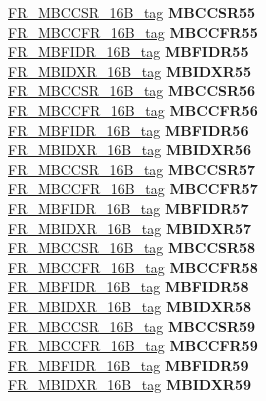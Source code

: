 \begin{DoxyCompactItemize}
\begin{tabbing}
\>\>\mbox{\hyperlink{unionFR__MBCCSR__16B__tag}{FR\_MBCCSR\_16B\_tag}} {\bfseries MBCCSR55}\\
\>\>\mbox{\hyperlink{unionFR__MBCCFR__16B__tag}{FR\_MBCCFR\_16B\_tag}} {\bfseries MBCCFR55}\\
\>\>\mbox{\hyperlink{unionFR__MBFIDR__16B__tag}{FR\_MBFIDR\_16B\_tag}} {\bfseries MBFIDR55}\\
\>\>\mbox{\hyperlink{unionFR__MBIDXR__16B__tag}{FR\_MBIDXR\_16B\_tag}} {\bfseries MBIDXR55}\\
\>\>\mbox{\hyperlink{unionFR__MBCCSR__16B__tag}{FR\_MBCCSR\_16B\_tag}} {\bfseries MBCCSR56}\\
\>\>\mbox{\hyperlink{unionFR__MBCCFR__16B__tag}{FR\_MBCCFR\_16B\_tag}} {\bfseries MBCCFR56}\\
\>\>\mbox{\hyperlink{unionFR__MBFIDR__16B__tag}{FR\_MBFIDR\_16B\_tag}} {\bfseries MBFIDR56}\\
\>\>\mbox{\hyperlink{unionFR__MBIDXR__16B__tag}{FR\_MBIDXR\_16B\_tag}} {\bfseries MBIDXR56}\\
\>\>\mbox{\hyperlink{unionFR__MBCCSR__16B__tag}{FR\_MBCCSR\_16B\_tag}} {\bfseries MBCCSR57}\\
\>\>\mbox{\hyperlink{unionFR__MBCCFR__16B__tag}{FR\_MBCCFR\_16B\_tag}} {\bfseries MBCCFR57}\\
\>\>\mbox{\hyperlink{unionFR__MBFIDR__16B__tag}{FR\_MBFIDR\_16B\_tag}} {\bfseries MBFIDR57}\\
\>\>\mbox{\hyperlink{unionFR__MBIDXR__16B__tag}{FR\_MBIDXR\_16B\_tag}} {\bfseries MBIDXR57}\\
\>\>\mbox{\hyperlink{unionFR__MBCCSR__16B__tag}{FR\_MBCCSR\_16B\_tag}} {\bfseries MBCCSR58}\\
\>\>\mbox{\hyperlink{unionFR__MBCCFR__16B__tag}{FR\_MBCCFR\_16B\_tag}} {\bfseries MBCCFR58}\\
\>\>\mbox{\hyperlink{unionFR__MBFIDR__16B__tag}{FR\_MBFIDR\_16B\_tag}} {\bfseries MBFIDR58}\\
\>\>\mbox{\hyperlink{unionFR__MBIDXR__16B__tag}{FR\_MBIDXR\_16B\_tag}} {\bfseries MBIDXR58}\\
\>\>\mbox{\hyperlink{unionFR__MBCCSR__16B__tag}{FR\_MBCCSR\_16B\_tag}} {\bfseries MBCCSR59}\\
\>\>\mbox{\hyperlink{unionFR__MBCCFR__16B__tag}{FR\_MBCCFR\_16B\_tag}} {\bfseries MBCCFR59}\\
\>\>\mbox{\hyperlink{unionFR__MBFIDR__16B__tag}{FR\_MBFIDR\_16B\_tag}} {\bfseries MBFIDR59}\\
\>\>\mbox{\hyperlink{unionFR__MBIDXR__16B__tag}{FR\_MBIDXR\_16B\_tag}} {\bfseries MBIDXR59}\\

\end{tabbing}
\end{DoxyCompactItemize}
